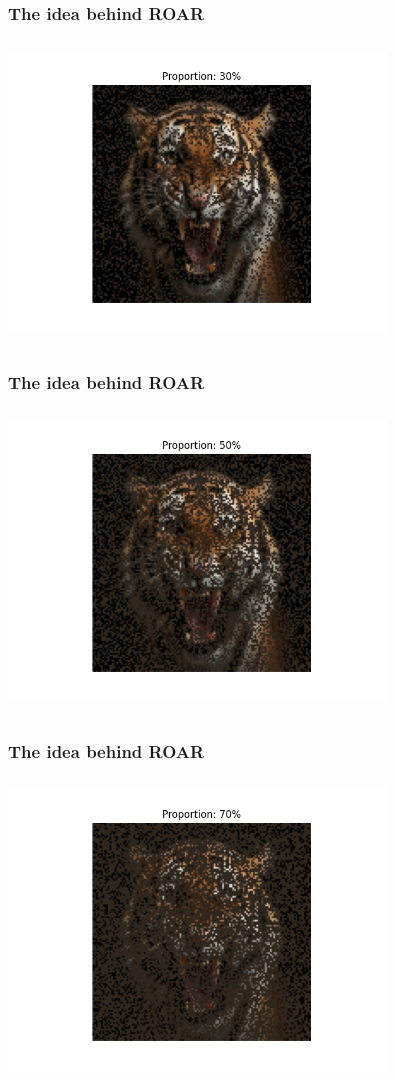 \documentclass{beamer}
\theoremstyle{mystyle}
\begin{document}
\begin{frame}
	\frametitle{The idea behind ROAR}
	\includegraphics[height=8cm, width=10cm]{tiger0.3.png}

\end{frame}

\begin{frame}
	\frametitle{The idea behind ROAR}
	\includegraphics[height=8cm, width=10cm]{tiger0.5.png}

\end{frame}

\begin{frame}
	\frametitle{The idea behind ROAR}
	\includegraphics[height=8cm, width=10cm]{tiger0.7.png}

\end{frame}
\end{document}
